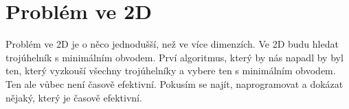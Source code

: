 \chapter{Problém ve 2D}
\label{chap:problem2d}
Problém ve 2D je o něco jednodušší, než ve více dimenzích. Ve 2D budu hledat trojúhelník s minimálním obvodem. Prví algoritmus, který by nás napadl by byl ten, který vyzkouší všechny trojúhelníky a vybere ten s minimálním obvodem. Ten ale vůbec není časově efektivní. Pokusím se najít, naprogramovat a dokázat nějaký, který je časově efektivní. 



\clearpage
